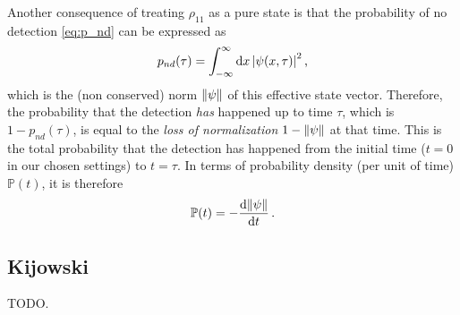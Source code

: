 Another consequence of treating $\rho_{11}$ as a pure state is that the probability of no detection
\eqref{eq:p_nd} can be expressed as
\begin{equation}
  p_{nd}(\tau) = \int_{-\infty}^{\infty} \dd{x} \qty|\psi(x, \tau)|^2 \, \text{,}
\end{equation}
which is the (non conserved) norm $\norm{\psi}$ of this effective state vector.
Therefore, the probability that the detection \emph{has} happened
up to time $\tau$, which is $1 - p_{nd}(\tau)$, is equal to the
\emph{loss of normalization} $1 - \norm{\psi}$ at that time.
This is the total probability that the detection has happened from the initial time
($t=0$ in our chosen settings)
to $t = \tau$. In terms of probability density (per unit of time)
$\mathbb{P}(t)$, it is therefore
\begin{equation}
  \mathbb{P}(t) = - \dv{\norm{\psi}}{t} \,\text{.}
\end{equation}

\subsection{Kijowski}\label{sec:kijowski}

TODO.

